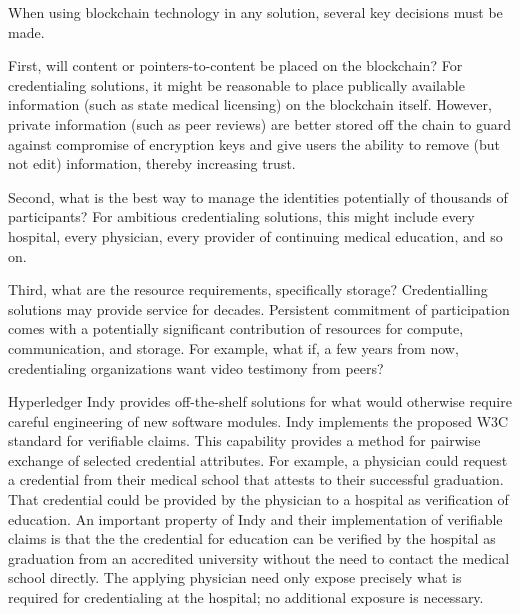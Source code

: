 When using blockchain technology in any solution, several key decisions must be made.

First, will content or pointers-to-content be placed on the blockchain?  For credentialing
solutions, it might be reasonable to place publically available information (such as state medical
licensing) on the blockchain itself.  However, private information (such as peer reviews) are better
stored off the chain to guard against compromise of encryption keys and give users the ability to
remove (but not edit) information, thereby increasing trust.

Second, what is the best way to manage the identities potentially of thousands of participants?  For
ambitious credentialing solutions, this might include every hospital, every physician, every
provider of continuing medical education, and so on.

Third, what are the resource requirements, specifically storage? Credentialling solutions may
provide service for decades. Persistent commitment of participation comes with a potentially
significant contribution of resources for compute, communication, and storage. For example, what if,
a few years from now, credentialing organizations want video testimony from peers?

Hyperledger Indy provides off-the-shelf solutions for what would otherwise require careful
engineering of new software modules. Indy implements the proposed W3C standard for verifiable
claims. This capability provides a method for pairwise exchange of selected credential
attributes. For example, a physician could request a credential from their medical school that
attests to their successful graduation. That credential could be provided by the physician to a
hospital as verification of education. An important property of Indy and their implementation of
verifiable claims is that the the credential for education can be verified by the hospital as
graduation from an accredited university without the need to contact the medical school
directly. The applying physician need only expose precisely what is required for credentialing at
the hospital; no additional exposure is necessary.

